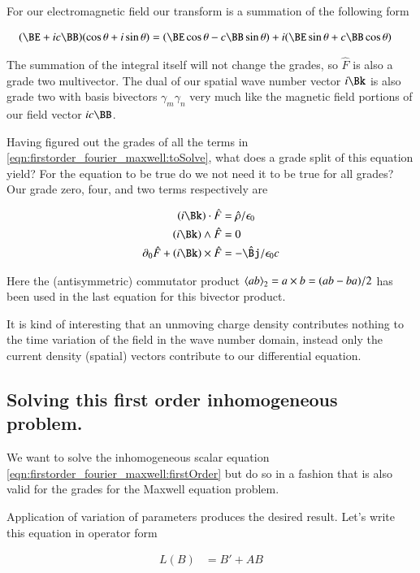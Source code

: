 For our electromagnetic field our transform is a summation of the following 
form

\begin{align*}
(\BE + i c \BB) (\cos\theta + i \sin\theta)
&=
(\BE \cos\theta - c \BB \sin\theta) + 
i (\BE \sin\theta + c \BB \cos\theta)
\end{align*}

The summation of the integral itself will not change the grades, so $\hat{F}$
is also a grade two multivector.  The dual of our spatial wave number
vector $i\Bk$ is also grade two with basis bivectors $\gamma_m \gamma_n$ very 
much like the magnetic field portions of our field vector $i c \BB$.

Having figured out the grades of all the terms in \ref{eqn:firstorder_fourier_maxwell:toSolve}, what
does a grade split of this equation yield?  For the equation to be true
do we not need it to be true for all grades?  Our grade zero, four, and two
terms respectively are

\begin{align*}
(i \Bk) \cdot \hat{F} &= \hat{\rho}/ \epsilon_0 \\
(i \Bk) \wedge \hat{F} &= 0 \\
\partial_0 \hat{F} + (i \Bk) \times \hat{F} &= -\hat{\Bj}/ \epsilon_0 c
\end{align*}

Here the (antisymmetric) commutator product ${\left\langle{{ab}}\right\rangle}_{2} = a \times b = (a b - ba)/2$ has been used in the last equation for this bivector product.

It is kind of interesting that an unmoving charge density contributes nothing
to the time variation of the field in the wave number domain, instead
only the current density (spatial) vectors contribute to our differential
equation.

\subsection{Solving this first order inhomogeneous problem. } 

We want to solve the inhomogeneous scalar equation 
\ref{eqn:firstorder_fourier_maxwell:firstOrder} but do so in a fashion that is also valid for
the grades for the Maxwell equation problem.

Application of variation of parameters produces the desired result.  Let's write this equation in operator form

\begin{align*}
L(B) &= B' + A B
\end{align*}

